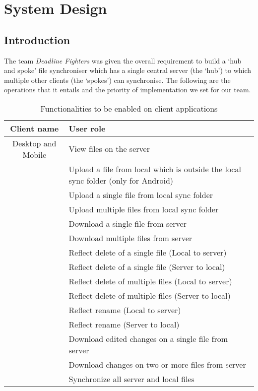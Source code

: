 \section{System Design}
\subsection{Introduction}
The team \emph{Deadline Fighters} was given the overall requirement to build a ‘hub and spoke’ file synchroniser which has a single central server (the ‘hub’) to which multiple other clients (the ‘spokes’) can synchronise. The following are the operations that it entails and the priority of implementation we set for our team.

\bgroup
\def\arraystretch{1.3}
\begin{table}[H]
\centering
\caption{Functionalities to be enabled on client applications}
\begin{tabular}{|c|m{8cm}|}
\hline
Client name & User role\\
\hline
{Desktop and Mobile} & View files on the server \\ \cline{2-2}
& Upload a file from local which is outside the local sync folder (only for Android) \\
\cline{2-2}
& Upload a single file from local sync folder \\
\cline{2-2}
& Upload multiple files from local sync folder\\
\cline{2-2}
&Download a single file from server\\
\cline{2-2}
&Download multiple files from server\\
\cline{2-2}
&Reflect delete of a single file (Local to server)\\
\cline{2-2}
&Reflect delete of a single file (Server to local)\\
\cline{2-2}
&Reflect delete of multiple files (Local to server)\\
\cline{2-2}
&Reflect delete of multiple files (Server to local)\\
\cline{2-2}
&Reflect rename (Local to server)\\
\cline{2-2}
&Reflect rename (Server to local)\\
\cline{2-2}
&Download edited changes on a single file from server\\
\cline{2-2}
&Download changes on two or more files from server\\
\cline{2-2}
&Synchronize all server and local files\\
\hline
\bottomrule
\end{tabular}
\end{table}
\egroup

